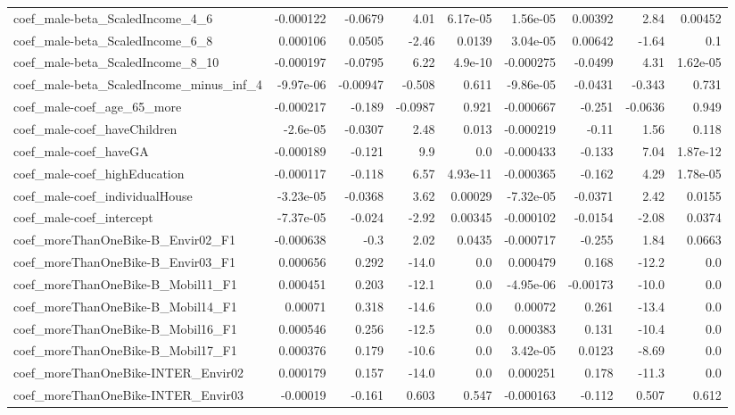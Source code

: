 \begin{tabular}{lrrrrrrrr}
coef_male-beta_ScaledIncome_4_6 & -0.000122 & -0.0679 & 4.01 & 6.17e-05 & 1.56e-05 & 0.00392 & 2.84 & 0.00452 \\
coef_male-beta_ScaledIncome_6_8 & 0.000106 & 0.0505 & -2.46 & 0.0139 & 3.04e-05 & 0.00642 & -1.64 & 0.1 \\
coef_male-beta_ScaledIncome_8_10 & -0.000197 & -0.0795 & 6.22 & 4.9e-10 & -0.000275 & -0.0499 & 4.31 & 1.62e-05 \\
coef_male-beta_ScaledIncome_minus_inf_4 & -9.97e-06 & -0.00947 & -0.508 & 0.611 & -9.86e-05 & -0.0431 & -0.343 & 0.731 \\
coef_male-coef_age_65_more & -0.000217 & -0.189 & -0.0987 & 0.921 & -0.000667 & -0.251 & -0.0636 & 0.949 \\
coef_male-coef_haveChildren & -2.6e-05 & -0.0307 & 2.48 & 0.013 & -0.000219 & -0.11 & 1.56 & 0.118 \\
coef_male-coef_haveGA & -0.000189 & -0.121 & 9.9 & 0.0 & -0.000433 & -0.133 & 7.04 & 1.87e-12 \\
coef_male-coef_highEducation & -0.000117 & -0.118 & 6.57 & 4.93e-11 & -0.000365 & -0.162 & 4.29 & 1.78e-05 \\
coef_male-coef_individualHouse & -3.23e-05 & -0.0368 & 3.62 & 0.00029 & -7.32e-05 & -0.0371 & 2.42 & 0.0155 \\
coef_male-coef_intercept & -7.37e-05 & -0.024 & -2.92 & 0.00345 & -0.000102 & -0.0154 & -2.08 & 0.0374 \\
coef_moreThanOneBike-B_Envir02_F1 & -0.000638 & -0.3 & 2.02 & 0.0435 & -0.000717 & -0.255 & 1.84 & 0.0663 \\
coef_moreThanOneBike-B_Envir03_F1 & 0.000656 & 0.292 & -14.0 & 0.0 & 0.000479 & 0.168 & -12.2 & 0.0 \\
coef_moreThanOneBike-B_Mobil11_F1 & 0.000451 & 0.203 & -12.1 & 0.0 & -4.95e-06 & -0.00173 & -10.0 & 0.0 \\
coef_moreThanOneBike-B_Mobil14_F1 & 0.00071 & 0.318 & -14.6 & 0.0 & 0.00072 & 0.261 & -13.4 & 0.0 \\
coef_moreThanOneBike-B_Mobil16_F1 & 0.000546 & 0.256 & -12.5 & 0.0 & 0.000383 & 0.131 & -10.4 & 0.0 \\
coef_moreThanOneBike-B_Mobil17_F1 & 0.000376 & 0.179 & -10.6 & 0.0 & 3.42e-05 & 0.0123 & -8.69 & 0.0 \\
coef_moreThanOneBike-INTER_Envir02 & 0.000179 & 0.157 & -14.0 & 0.0 & 0.000251 & 0.178 & -11.3 & 0.0 \\
coef_moreThanOneBike-INTER_Envir03 & -0.00019 & -0.161 & 0.603 & 0.547 & -0.000163 & -0.112 & 0.507 & 0.612 \\

\end{tabular}
